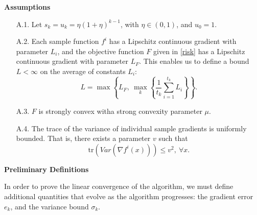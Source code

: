 \documentclass[11pt]{article}
\begin{document}
 
 \bigskip

\noindent\textbf{Assumptions}

\begin{itemize}
 \item[    A.1.] Let $s_k=u_k=\eta (1+\eta)^{k-1}$, with $\eta \in (0,1)$, and $u_0=1$.

 \item[    A.2.] Each sample function $f^i$ has a Lipschitz continuous gradient with parameter $L_i$, and  the objective function $F$ given in \eqref{risk} has a Lipschitz continuous gradient with parameter $L_F$. This enables us to define a bound $L<\infty$ on the average of constants $L_i$:
 \begin{equation}\label{eq:L}
  L = \max \left\{L_F, \ \max_k \left\{\frac{1}{t_{k}}\sum_{i=1}^{t_k}L_i\right\}\right\}.
 \end{equation}

 \item[    A.3.] $F$ is strongly convex witha strong convexity parameter $\mu$.
 
 \item[    A.4.] The trace of the variance of individual sample gradients is uniformly bounded. That is, there exists a parameter $v$ such that
 \[
   \mbox{tr}(Var(\nabla f^i(x))) \leq v^2, \ \forall x.
 \]

\end{itemize}


\noindent\textbf{Preliminary Definitions}

In order to prove the linear convergence of the algorithm, we must define additional quantities that evolve as the algorithm progresses: the gradient error $e_k$, and the variance bound $\sigma_k$.

\end{document}
